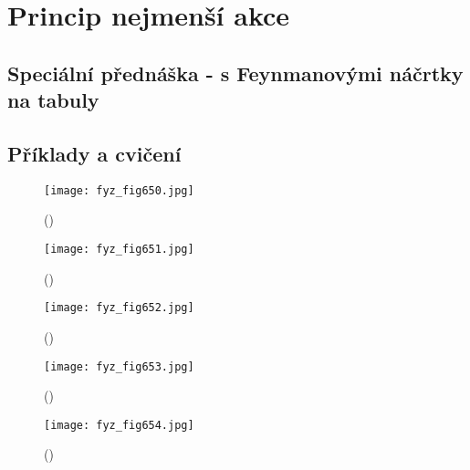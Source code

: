 {
\chapter{Princip nejmenší akce}\label{fyz:IIchaXIX}
\minitoc
  \section{Speciální přednáška - s Feynmanovými náčrtky na tabuly}\label{fyz:IIchaXIXsecI}
  \section{Příklady a cvičení}\label{fyz:IIchaXIXsecII}

    \begin{figure}[ht!] %
      \centering
      \texttt{[image: fyz\_fig650.jpg]}
      \caption{
               (\cite[s.~707]{Feynman02})}
      \label{fyz_fig650}
    \end{figure}

    \begin{figure}[ht!] %
      \centering
      \texttt{[image: fyz\_fig651.jpg]}
      \caption{
               (\cite[s.~707]{Feynman02})}
      \label{fyz_fig651}
    \end{figure}

    \begin{figure}[ht!] %
      \centering
      \texttt{[image: fyz\_fig652.jpg]}
      \caption{
               (\cite[s.~707]{Feynman02})}
      \label{fyz_fig652}
    \end{figure}

    \begin{figure}[ht!] %
      \centering
      \texttt{[image: fyz\_fig653.jpg]}
      \caption{
               (\cite[s.~707]{Feynman02})}
      \label{fyz_fig653}
    \end{figure}

    \begin{figure}[ht!] %
      \centering
      \texttt{[image: fyz\_fig654.jpg]}
      \caption{
               (\cite[s.~707]{Feynman02})}
      \label{fyz_fig654}
    \end{figure}

}
